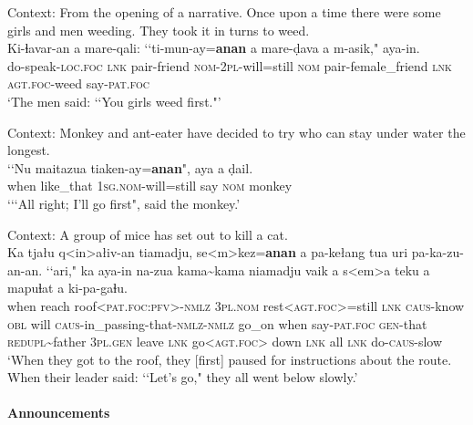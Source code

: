 \begin{exe}
	\ex Context: From the opening of a narrative. Once upon a time there were some girls and men weeding. They took it in turns to weed.\\
	\gll  Ki-ɬavar-an a mare-qali: \lq\lq ti-mun-ay=\textbf{anan} a mare-ḍava a m-asik," aya-in.\\
	 do-speak-\textsc{loc}.\textsc{foc} \textsc{lnk} pair-friend \phantom{\lq\lq{}}\textsc{nom}-2\textsc{pl}-will=still \textsc{nom} pair-female\_friend \textsc{lnk} \textsc{agt}.\textsc{foc}-weed say-\textsc{pat}.\textsc{foc}\\
	\glt \lq  The men said: \lq\lq You girls weed first."' \parencite[108]{EarlyWhitehorn2003}

	\ex
	Context: Monkey and ant-eater have decided to try who can stay under water the longest.\\
	\gll \lq\lq Nu maitazua tiaken-ay=\textbf{anan}", aya a ḍail.\\
	\phantom{\lq\lq}when like\_that 1\textsc{sg}.\textsc{nom}-will=still say \textsc{nom} monkey\\
	\glt \lq {\lq\lq}All right; I’ll go first", said the monkey.\rq{ }\parencite[250]{EarlyWhitehorn2003}

	\ex Context: A group of mice has set out to kill a cat.\\
	\gll Ka tjału q<in>ałiv-an tiamadju, se<m>kez=\textbf{anan} a pa-kełang tua uri pa-ka-zu-an-an. \lq\lq ari," ka aya-in na-zua kama\sim{}kama niamadju vaik a s<em>a teku a mapuɬat a ki-pa-gaɬu.\\
	when reach roof<\textsc{pat}.\textsc{foc}:\textsc{pfv}>-\textsc{nmlz} 3\textsc{pl}.\textsc{nom} rest<\textsc{agt}.\textsc{foc}>=still \textsc{lnk} \textsc{caus}-know \textsc{obl} will \textsc{caus}-in\_passing-that-\textsc{nmlz}-\textsc{nmlz} \phantom{\lq\lq}go\_on when say-\textsc{pat}.\textsc{foc} \textsc{gen}-that \textsc{redupl}\sim{}father 3\textsc{pl}.\textsc{gen} leave \textsc{lnk} go<\textsc{agt}.\textsc{foc}> down \textsc{lnk} all \textsc{lnk} do-\textsc{caus}-slow\\
	\glt \lq When they got to the roof, they [first] paused for instructions about the route. When their leader said: \lq\lq Let’s go," they all went below slowly.' \parencite[386–387]{EarlyWhitehorn2003}
\end{exe}

\paragraph{Announcements}\label{appendixPaiwanAnnouncement}

